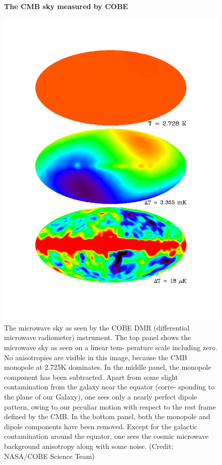 \documentclass{article}
\begin{document}
\begin{figure}
\centering
    \textbf{The CMB sky measured by COBE}\par\medskip
\centering
\includegraphics[scale =0.3]{mono_di_cobe}
\caption{The microwave sky as seen by the COBE DMR (differential microwave radiometer) instrument. The top panel shows the microwave sky as seen on a linear tem- perature scale including zero. No anisotropies are visible in this image, because the CMB monopole at 2.725K dominates. In the middle panel, the monopole component has been subtracted. Apart from some slight contamination from the galaxy near the equator (corre- sponding to the plane of our Galaxy), one sees only a nearly perfect dipole pattern, owing to our peculiar motion with respect to the rest frame defined by the CMB. In the bottom panel, both the monopole and dipole components have been removed. Except for the galactic contamination around the equator, one sees the cosmic microwave background anisotropy along with some noise. (Credit: NASA/COBE Science Team)}
\label{cobe_map}
\end{figure}
\end{document}
